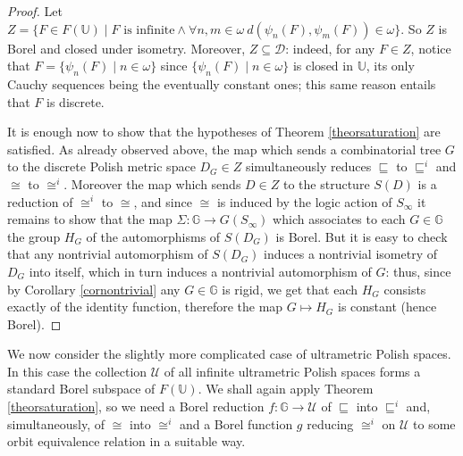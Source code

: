 \documentclass{amsart}
\theoremstyle{definition}
\theoremstyle{remark}
\begin{document}
\begin{proof}
Let $Z=\{ F\in F( \mathbb U )\mid F \mbox{ is infinite} \wedge\forall n,m\in\omega\ d(\psi_n(F),\psi_m(F))\in\omega\} $.
So $Z$ is Borel and closed under isometry.
Moreover, $Z\subseteq \mathcal D $:
indeed, for any $F\in Z$, notice that $F=\{\psi_n(F)\mid n\in\omega\} $ since $\{\psi_n(F)\mid n\in\omega\} $ is closed
in $ \mathbb U $, its only Cauchy sequences being the eventually constant ones; this same reason entails that $F$ is discrete.

It is
enough now to show that the hypotheses of Theorem \ref{theorsaturation}
are satisfied. As
already observed above, the map which sends a combinatorial tree $G$ to
the discrete Polish metric space $D_G\in Z$ simultaneously reduces
$\sqsubseteq$ to $\sqsubseteq^i$ and $\cong$ to $\cong^i$. Moreover
the map which sends $D\in Z$ to the structure
$S(D)$ is a reduction of $\cong^i$ to $\cong$, and since $\cong$ is
induced by the
logic action of $S_\infty$ it remains to show that the map $\Sigma
\colon {\mathbb{G}}
\to G(S_\infty)$ which associates to each $G \in {\mathbb{G}}$ the group
$H_G$ of the
automorphisms of $S(D_G)$ is Borel. But it is easy to check that any
nontrivial automorphism of $S(D_G)$ induces a nontrivial isometry of
$D_G$ into itself, which in turn induces a nontrivial automorphism of
$G$: thus, since by Corollary \ref{cornontrivial} any $G \in {\mathbb{G}}$ is
rigid, we get
that each $H_G$ consists exactly of the
identity function, therefore the  map $G \mapsto H_G$ is constant
(hence Borel).
\end{proof}

We now consider the slightly more complicated case of
ultrametric Polish spaces. In this case the collection $\mathcal{U}$
of all infinite ultrametric Polish spaces forms a
standard Borel subspace of $F(\mathbb{U})$. We shall again apply
Theorem \ref{theorsaturation}, so we need a Borel reduction $f \colon {\mathbb{G}} \to
\mathcal{U}$ of $\sqsubseteq$ into $\sqsubseteq^i$ and, simultaneously, of
$\cong$ into $\cong^i$ and a Borel function $g$ reducing $\cong^i$ on $\mathcal{U}$
to some orbit equivalence relation in a suitable way.
\end{document}
